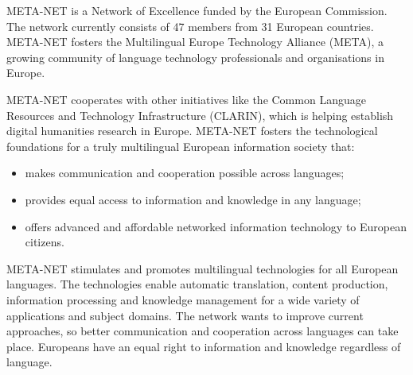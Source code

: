 \begin{multicols}{2}
                                                                                                                                                                                                                                                                                                                                                                                                                                                                                                                                                                                                                                                                                                                                                                                                                                                                                                                                                                                                                              
                                                                                                                                                                                                                                                                                                                                                META-NET is a Network of Excellence funded by the European Commission. The network currently consists of 47 members from 31 European countries. META-NET fosters the Multilingual Europe Technology Alliance (META), a growing community of language technology professionals and organisations in Europe. 

META-NET cooperates with other initiatives like the Common Language Resources and Technology Infrastructure (CLARIN), which is helping establish digital humanities research in Europe. META-NET fosters the technological foundations for a truly multilingual European information society that:
\begin{itemize}
\item makes communication and cooperation possible across languages;
\item provides equal access to information and knowledge in any language;
\item offers advanced and affordable networked information technology to European citizens.
\end{itemize}

META-NET stimulates and promotes multilingual technologies for all European languages. The technologies enable automatic translation, content production, information processing and knowledge management for a wide variety of applications and subject domains. The network wants to improve current approaches, so better communication and cooperation across languages can take place. Europeans have an equal right to information and knowledge regardless of language. 


\end{multicols}
